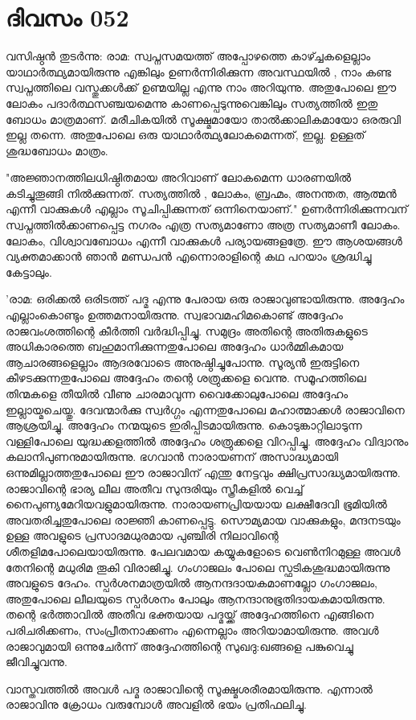  
\section{ദിവസം 052}


വസിഷ്ഠന്‍ തുടര്‍ന്നു: രാമ: സ്വപ്നസമയത്ത്‌ അപ്പോഴത്തെ കാഴ്ച്ചകളെല്ലാം യാഥാര്‍ത്ഥ്യമായിരുന്നു എങ്കിലും ഉണര്‍ന്നിരിക്കുന്ന അവസ്ഥയില്‍ , നാം കണ്ട സ്വപ്നത്തിലെ വസ്തുക്കള്‍ക്ക്‌ ഉണ്മയില്ല എന്നു നാം അറിയുന്നു. അതുപോലെ ഈ ലോകം പദാര്‍ത്ഥസഞ്ചയമെന്നു കാണപ്പെടുന്നുവെങ്കിലും സത്യത്തില്‍ ഇതു ബോധം മാത്രമാണ്‌. മരീചികയില്‍ സൂക്ഷ്മമായോ താല്‍ക്കാലികമായോ ഒരരുവി ഇല്ല തന്നെ. അതുപോലെ ഒരു യാഥാര്‍ത്ഥ്യലോകമെന്നത്‌, ഇല്ല. ഉള്ളത്‌ ശുദ്ധബോധം മാത്രം.

"അജ്ഞാനത്തിലധിഷ്ഠിതമായ അറിവാണ്‌ ലോകമെന്ന ധാരണയില്‍ കടിച്ചുതൂങ്ങി നില്‍ക്കുന്നത്‌. സത്യത്തില്‍ , ലോകം, ബ്രഹ്മം, അനന്തത, ആത്മന്‍ എന്നീ വാക്കുകള്‍ എല്ലാം സൂചിപ്പിക്കുന്നത്‌ ഒന്നിനെയാണ്‌."  ഉണര്‍ന്നിരിക്കുന്നവന്‌ സ്വപ്നത്തില്‍ക്കാണപ്പെട്ട നഗരം എത്ര സത്യമാണോ അത്ര സത്യമാണീ ലോകം. ലോകം, വിശ്വാവബോധം എന്നീ വാക്കുകള്‍ പര്യായങ്ങളത്രേ. ഈ ആശയങ്ങള്‍ വ്യക്തമാക്കാന്‍ ഞാന്‍ മണ്ഡപന്‍ എന്നൊരാളിന്റെ കഥ പറയാം ശ്രദ്ധിച്ചു കേട്ടാലും.

'രാമ: ഒരിക്കല്‍ ഒരിടത്ത്‌ പദ്മ എന്നു പേരായ ഒരു രാജാവുണ്ടായിരുന്നു. അദ്ദേഹം എല്ലാംകൊണ്ടും ഉത്തമനായിരുന്നു. സ്വഭാവമഹിമകൊണ്ട്‌ അദ്ദേഹം രാജവംശത്തിന്റെ കീര്‍ത്തി വര്‍ദ്ധിപ്പിച്ചു. സമുദ്രം അതിന്റെ അതിരുകളുടെ അധികാരത്തെ ബഹുമാനിക്കുന്നതുപോലെ അദ്ദേഹം ധാര്‍മ്മികമായ ആചാരങ്ങളെല്ലാം ആദരവോടെ അനുഷ്ഠിച്ചുപോന്നു. സൂര്യന്‍ ഇരുട്ടിനെ കീഴടക്കുന്നതുപോലെ അദ്ദേഹം തന്റെ ശത്രുക്കളെ വെന്നു. സമൂഹത്തിലെ തിന്മകളെ തീയില്‍ വീണു ചാരമാവുന്ന വൈക്കോലുപോലെ അദ്ദേഹം ഇല്ലായ്മചെയ്തു. ദേവന്മാര്‍ക്കു സ്വര്‍ഗ്ഗം എന്നതുപോലെ മഹാത്മാക്കള്‍ രാജാവിനെ ആശ്രയിച്ചു. അദ്ദേഹം നന്മയുടെ ഇരിപ്പിടമായിരുന്നു. കൊടുങ്കാറ്റിലാടുന്ന വള്ളിപോലെ യുദ്ധക്കളത്തില്‍ അദ്ദേഹം ശത്രുക്കളെ വിറപ്പിച്ചു. അദ്ദേഹം വിദ്വാനും കലാനിപുണനുമായിരുന്നു. ഭഗവാന്‍ നാരായണന്‌ അസാദ്ധ്യമായി ഒന്നുമില്ലാത്തതുപോലെ ഈ രാജാവിന്‌ എന്തു നേട്ടവും ക്ഷിപ്രസാദ്ധ്യമായിരുന്നു. രാജാവിന്റെ ഭാര്യ ലീല അതീവ സുന്ദരിയും സ്ത്രീകളില്‍ വെച്ച്‌ നൈപുണ്യമേറിയവളുമായിരുന്നു. നാരായണപ്രിയയായ ലക്ഷീദേവി ഭൂമിയില്‍ അവതരിച്ചതുപോലെ രാജ്ഞി കാണപ്പെട്ടു. സൌമ്യമായ വാക്കുകളും, മന്ദനടയും ഉള്ള അവളുടെ പ്രസാദമധുരമായ പുഞ്ചിരി നിലാവിന്റെ ശീതളിമപോലെയായിരുന്നു. പേലവമായ കയ്യുകളോടെ വെണ്‍നിറമുള്ള അവള്‍ തേനിന്റെ മധുരിമ തൂകി വിരാജിച്ചു. ഗംഗാജലം പോലെ സ്ഫടികശുദ്ധമായിരുന്നു അവളുടെ ദേഹം. സ്പര്‍ശനമാത്രയില്‍ ആനന്ദദായകമാണല്ലോ ഗംഗാജലം, അതുപോലെ ലീലയുടെ സ്പര്‍ശനം പോലും ആനന്ദാനുഭൂതിദായകമായിരുന്നു. തന്റെ ഭര്‍ത്താവില്‍ അതീവ ഭക്തയായ പദ്മയ്ക്ക്‌ അദ്ദേഹത്തിനെ എങ്ങിനെ പരിചരിക്കണം, സംപ്രീതനാക്കണം എന്നെല്ലാം അറിയാമായിരുന്നു. അവള്‍ രാജാവുമായി ഒന്നുചേര്‍ന്ന് അദ്ദേഹത്തിന്റെ സുഖദു:ഖങ്ങളെ പങ്കുവെച്ചു ജീവിച്ചുവന്നു. 

വാസ്തവത്തില്‍ അവള്‍ പദ്മ രാജാവിന്റെ സൂക്ഷ്മശരീരമായിരുന്നു. എന്നാല്‍ രാജാവിനു ക്രോധം വരുമ്പോള്‍ അവളില്‍ ഭയം പ്രതിഫലിച്ചു.
